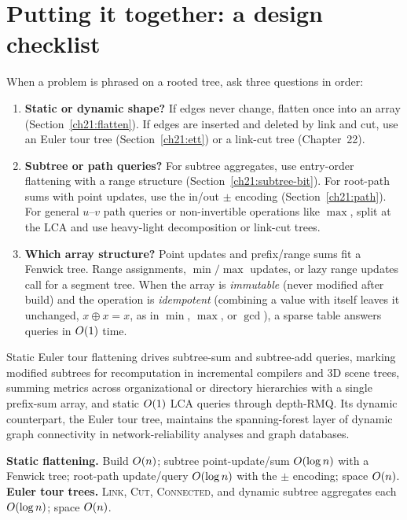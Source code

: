 \section{Putting it together: a design checklist}
\label{ch21:checklist}

When a problem is phrased on a rooted tree, ask three questions in order:

\begin{enumerate}
\item \textbf{Static or dynamic shape?} If edges never change, flatten once into an array
(Section~\ref{ch21:flatten}). If edges are inserted and deleted by link and cut, use an Euler tour
tree (Section~\ref{ch21:ett}) or a link-cut tree (Chapter~22).
\item \textbf{Subtree or path queries?} For subtree aggregates, use entry-order
flattening with a range structure (Section~\ref{ch21:subtree-bit}). For root-path sums with point updates,
use the in/out $\pm$ encoding (Section~\ref{ch21:path}). For general $u$--$v$ path queries or non-invertible operations like $\max$,
split at the LCA and use heavy-light decomposition or link-cut trees.
\item \textbf{Which array structure?} Point updates and prefix/range sums fit a Fenwick tree. Range assignments, $\min/\max$ updates, or lazy range updates call for a segment tree. When the array is \emph{immutable} (never modified after build) and the operation is \emph{idempotent} (combining a value with itself leaves it unchanged, $x \oplus x = x$, as in $\min$, $\max$, or $\gcd$), a sparse table answers queries in $O(1)$ time.
\end{enumerate}

\begin{applicationbox}
Static Euler tour flattening drives subtree-sum and subtree-add queries, marking modified subtrees for recomputation in incremental compilers and 3D scene trees, summing metrics across organizational or directory hierarchies with a single prefix-sum array, and static $O(1)$ LCA queries through depth-RMQ. Its dynamic counterpart,
the Euler tour tree, maintains the spanning-forest layer of dynamic graph
connectivity in network-reliability analyses and graph databases.
\end{applicationbox}

\begin{complexitybox}
\textbf{Static flattening.} Build $O(n)$; subtree point-update/sum $O(\log n)$ with a
Fenwick tree; root-path update/query $O(\log n)$ with the $\pm$ encoding; space $O(n)$.
\textbf{Euler tour trees.} \textsc{Link}, \textsc{Cut}, \textsc{Connected}, and dynamic subtree
aggregates each $O(\log n)$; space $O(n)$.
\end{complexitybox}

